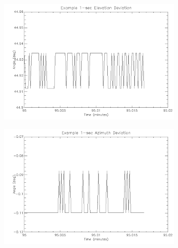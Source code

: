{\newpage
\begin{figure}[htbp]
\captionsetup[subfigure]{justification=centering}
\captionsetup{justification=centering}
    \centering
	\begin{subfigure}{0.45\textwidth}
		\includegraphics[width=1\linewidth]{appendix/img/campaign_results/latealt1sec.png}
		\caption{}
		\label{fig:sub:latealt1}
	\end{subfigure}
	\begin{subfigure}{0.45\textwidth}
		\includegraphics[width=1\linewidth]{appendix/img/campaign_results/lateaz1sec.png}
		\caption{}
		\label{fig:sub:lateaz1}
	\end{subfigure}
	\begin{subfigure}{0.45\textwidth}

\end{subfigure}
\end{figure}}

